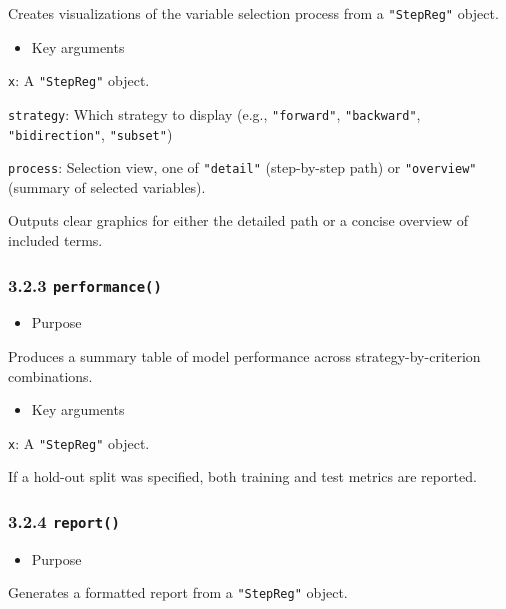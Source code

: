 Creates visualizations of the variable selection process from a \texttt{"StepReg"} object.

\begin{itemize}
\tightlist
\item
  Key arguments
\end{itemize}

\texttt{x}: A \texttt{"StepReg"} object.

\texttt{strategy}: Which strategy to display (e.g., \texttt{"forward"}, \texttt{"backward"}, \texttt{"bidirection"}, \texttt{"subset"})

\texttt{process}: Selection view, one of \texttt{"detail"} (step-by-step path) or \texttt{"overview"} (summary of selected variables).

Outputs clear graphics for either the detailed path or a concise overview of included terms.

\subsubsection{\texorpdfstring{3.2.3 \texttt{performance()}}{3.2.3 performance()}}\label{performance}

\begin{itemize}
\tightlist
\item
  Purpose
\end{itemize}

Produces a summary table of model performance across strategy-by-criterion combinations.

\begin{itemize}
\tightlist
\item
  Key arguments
\end{itemize}

\texttt{x}: A \texttt{"StepReg"} object.

If a hold-out split was specified, both training and test metrics are reported.

\subsubsection{\texorpdfstring{3.2.4 \texttt{report()}}{3.2.4 report()}}\label{report}

\begin{itemize}
\tightlist
\item
  Purpose
\end{itemize}

Generates a formatted report from a \texttt{"StepReg"} object.

